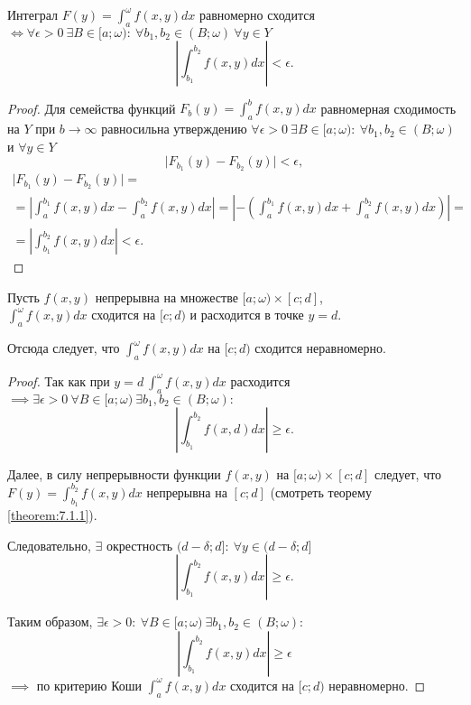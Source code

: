 \begin{theorem}
    Интеграл $F(y) = \int_{a}^{\omega}f(x,y)dx$ равномерно сходится $\iff \forall \epsilon > 0 \ \exists B \in [a;\omega): \ \forall b_1,b_2 \in (B;\omega) \ \forall y \in Y$
    \[
        \left|\int_{b_1}^{b_2}f(x,y)dx\right| < \epsilon.
    \]
\end{theorem}

\begin{proof}
    Для семейства функций $F_b(y) = \int_{a}^{b}f(x,y)dx$ равномерная сходимость на $Y$ при $b\rightarrow\infty$ равносильна утверждению $\forall \epsilon > 0 \ \exists B \in [a;\omega): \ \forall b_1,b_2 \in (B;\omega)$ и $\forall y \in Y$
    \[
        \big|F_{b_1}(y) - F_{b_2}(y)\big| < \epsilon,
    \]
    \begin{multline*}
        \big|F_{b_1}(y) - F_{b_2}(y)\big| = \\
        = \left|\int_{a}^{b_1}f(x,y)dx - \int_{a}^{b_2}f(x,y)dx\right| = \left|-\left(\int_{a}^{b_1}f(x,y)dx + \int_{a}^{b_2}f(x,y)dx\right)\right| = \\
        = \left|\int_{b_1}^{b_2}f(x,y)dx\right| < \epsilon.
    \end{multline*}
\end{proof}

\begin{corollary}
    Пусть $f(x,y)$ непрерывна на множестве $[a;\omega)\times[c;d] $, \\ $\int_{a}^{\omega}f(x,y)dx$ сходится на $[c;d)$ и расходится в точке $y = d$.

    Отсюда следует, что $\int_{a}^{\omega}f(x,y)dx$ на $[c;d)$ сходится неравномерно.
\end{corollary}

\begin{proof}
    Так как при $y = d \ \int_{a}^{\omega}f(x,y)dx$ расходится $\implies \exists \epsilon > 0 \ \forall B \in [a;\omega) \ \exists b_1,b_2 \in (B;\omega):$
                \[
                    \left|\int_{b_1}^{b_2}f(x,d)dx\right| \geqslant \epsilon.
                \]

                Далее, в силу непрерывности функции $f(x,y)$ на $[a;\omega)\times [c;d]$ следует, что $F(y) = \int_{b_1}^{b_2}f(x,y)dx$ непрерывна на $[c;d]$ (смотреть теорему \ref{theorem:7.1.1}).

                        Следовательно, $\exists$ окрестность $(d - \delta;d]: \ \forall y \in (d - \delta;d]$
    \[
        \left|\int_{b_1}^{b_2}f(x,y)dx\right| \geqslant \epsilon.
    \]

    Таким образом, $\exists \epsilon > 0: \ \forall B \in [a;\omega) \ \exists b_1,b_2 \in (B;\omega):$
    \[
        \left|\int_{b_1}^{b_2}f(x,y)dx\right| \geqslant \epsilon
    \]
    $\implies$ по критерию Коши $\int_{a}^{\omega}f(x,y)dx$ сходится на $[c;d)$ неравномерно.
\end{proof}

